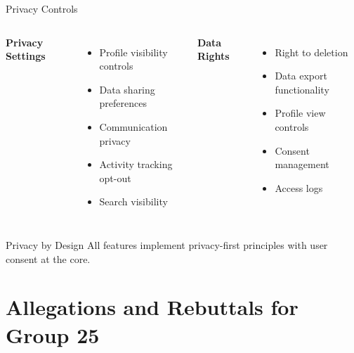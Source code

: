 \documentclass[aspectratio=169]{beamer}
\begin{document}
\begin{frame}{Privacy Controls}
\begin{columns}
\textbf{Privacy Settings}
\begin{itemize}
    \item Profile visibility controls
    \item Data sharing preferences
    \item Communication privacy
    \item Activity tracking opt-out
    \item Search visibility
\end{itemize}

\textbf{Data Rights}
\begin{itemize}
    \item Right to deletion
    \item Data export functionality
    \item Profile view controls
    \item Consent management
    \item Access logs
\end{itemize}
\end{columns}

\vspace{0.3cm}
\begin{alertblock}{Privacy by Design}
All features implement privacy-first principles with user consent at the core.
\end{alertblock}
\end{frame}

\section{Allegations and Rebuttals for Group 25}
\end{document}
